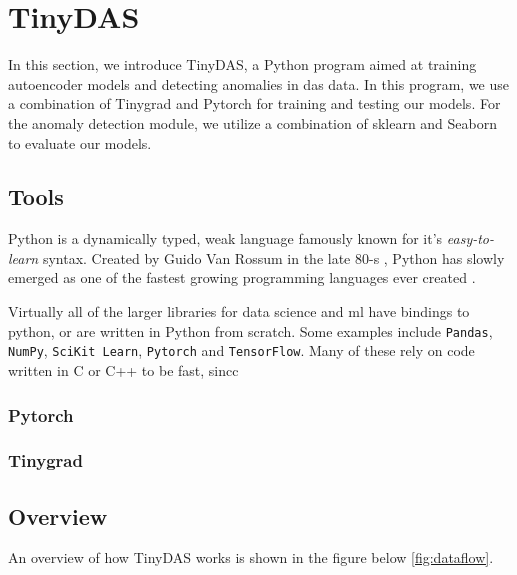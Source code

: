 \section{TinyDAS}

In this section, we introduce TinyDAS, a Python program aimed at training autoencoder models and detecting anomalies in \acrshort{das} data. In this program, we use a combination of Tinygrad and Pytorch for training and testing our models. For the anomaly detection module, we utilize a combination of sklearn and Seaborn to evaluate our models.

\subsection{Tools}

Python is a dynamically typed, weak language famously known for it's \textit{easy-to-learn} syntax. Created by Guido Van Rossum in the late 80-s \cite{python}, Python has slowly emerged as one of the fastest growing programming languages ever created \cite{srinath2017python}. 

Virtually all of the larger libraries for data science and \acrlong{ml} have bindings to \gls{python}, or are written in Python from scratch. Some examples include \texttt{Pandas}, \texttt{NumPy}, \texttt{SciKit Learn}, \texttt{Pytorch} and \texttt{TensorFlow}. Many of these rely on code written in C or C++ to be fast, sincc

\subsubsection{Pytorch}

\subsubsection{Tinygrad}




\subsection{Overview}

An overview of how TinyDAS works is shown in the figure below \ref{fig:dataflow}.

